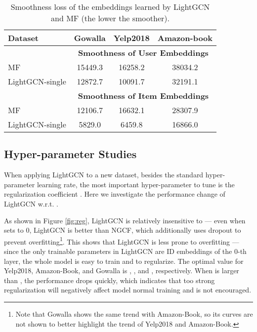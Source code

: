 \documentclass[sigconf]{acmart}
\theoremstyle{definition}
\begin{document}
\begin{table}[t]
\caption{Smoothness loss of the embeddings learned by LightGCN and MF (the lower the smoother).}\vspace{-8pt}
\label{tab:Smoothness}
\begin{tabular}{l|c|c|c}
\hline
\textbf{Dataset} & \multicolumn{1}{c|}{\textbf{Gowalla}} & \multicolumn{1}{c|}{\textbf{Yelp2018}} & \multicolumn{1}{c}{\textbf{Amazon-book}}\\ \hline
&\multicolumn{3}{c}{\textbf{Smoothness of User Embeddings}}\\ \hline
MF & 15449.3 & 16258.2 & 38034.2  \\ \hline
LightGCN-single & 12872.7 & 10091.7 & 32191.1 \\ \hline
&\multicolumn{3}{c}{\textbf{Smoothness of Item Embeddings}}\\ \hline
MF & 12106.7 & 16632.1 & 28307.9  \\ \hline
LightGCN-single & 5829.0 & 6459.8 & 16866.0 \\ \hline
\end{tabular}
\vspace{-5pt}
\end{table}



\subsection{Hyper-parameter Studies}\label{ss:exp-hyper}
When applying LightGCN to a new dataset, besides the standard hyper-parameter learning rate, the most important hyper-parameter to tune is the  regularization coefficient . 
Here we investigate the performance change of LightGCN w.r.t. . 

As shown in Figure \ref{fig:reg},
LightGCN is relatively insensitive to  --- even when  sets to 0, LightGCN is better than NGCF, which additionally uses dropout to prevent overfitting\footnote{Note that Gowalla shows the same trend with Amazon-Book, so its curves are not shown to better highlight the trend of Yelp2018 and Amazon-Book.}. 
This shows that LightGCN is less prone to overfitting --- since the only trainable parameters in LightGCN are ID embeddings of the 0-th layer, the whole model is easy to train and to regularize. The optimal value for Yelp2018, Amazon-Book, and Gowalla is , , and  , respectively. When  is larger than , the performance drops quickly, which indicates that too strong regularization will negatively affect model normal training and is not encouraged. 
\end{document}
